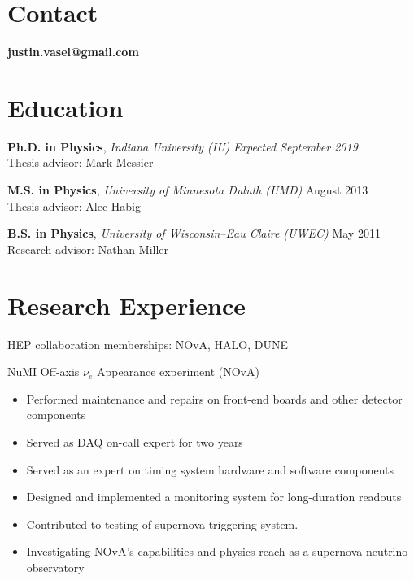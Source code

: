 \documentclass[11pt]{cv}
\begin{document}

\begin{cv}


\section{Contact}
\textbf{justin.vasel@gmail.com}


\section{Education}

\textbf{Ph.D. in Physics}, \emph{Indiana University (IU)} \hfill \emph{Expected September 2019} \\
Thesis advisor: Mark Messier

\textbf{M.S. in Physics}, \emph{University of Minnesota Duluth (UMD)} \hfill August 2013 \\
Thesis advisor: Alec Habig

\textbf{B.S. in Physics}, \emph{University of Wisconsin--Eau Claire (UWEC)} \hfill May 2011 \\
Research advisor: Nathan Miller


\section{Research Experience}

HEP collaboration memberships: NOvA, HALO, DUNE

NuMI Off-axis $\nu_e$ Appearance experiment (NOvA)
\begin{itemize}
  \item Performed maintenance and repairs on front-end boards and other detector components
  \item Served as DAQ on-call expert for two years
  \item Served as an expert on timing system hardware and software components
  \item Designed and implemented a monitoring system for long-duration readouts
  \item Contributed to testing of supernova triggering system.
  \item Investigating NOvA's capabilities and physics reach as a supernova neutrino observatory
\end{itemize}


\end{cv}
\end{document}
